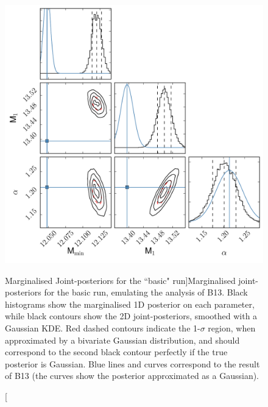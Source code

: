 \documentclass[5p]{elsarticle}
\begin{document}
 \begin{figure}
\centering
\includegraphics[width=\linewidth]{figures/typical_triangle.pdf} 
\caption[Marginalised Joint-posteriors for the ``basic" run]{Marginalised joint-posteriors for the basic run, emulating the analysis of B13. Black histograms show the marginalised 1D posterior on each parameter, while black contours show the 2D joint-posteriors, smoothed with a Gaussian KDE. Red dashed contours indicate the 1-$\sigma$ region, when approximated by a bivariate Gaussian distribution, and should correspond to the second black contour perfectly if the true posterior is Gaussian. Blue lines and curves correspond to the result of B13 (the curves show the posterior approximated as a Gaussian).}
\label{fig:typical}
\end{figure}
\end{document}
